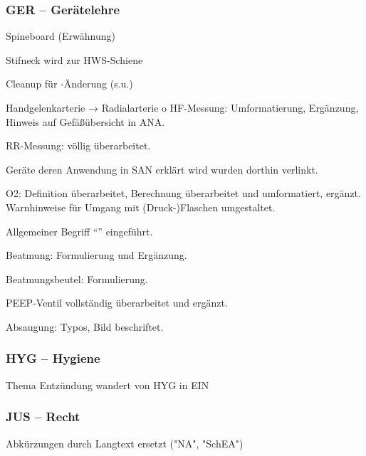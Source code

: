 \documentclass[ngerman,a4paper,fontsize=9pt,BCOR=0cm,DIV=11,headings=big,draft=no]{scrreprt}
\begin{document}
\subsubsection{GER -- Gerätelehre}

Spineboard (Erwähnung)

Stifneck wird zur HWS-Schiene


Cleanup für \gT-Änderung (s.u.)

Handgelenkarterie →
          Radialarterie o HF-Messung: Umformatierung, Ergänzung, Hinweis auf Gefäßübersicht in ANA.

RR-Messung: völlig
          überarbeitet. 
          
Geräte deren Anwendung in SAN erklärt wird wurden dorthin verlinkt.

O2: Definition überarbeitet,
Berechnung überarbeitet und umformatiert, ergänzt. Warnhinweise für Umgang mit (Druck-)Flaschen umgestaltet. 

Allgemeiner Begriff
"`"' eingeführt. 

Beatmung:
Formulierung und Ergänzung.

Beatmungsbeutel:
          Formulierung. 
          
PEEP-Ventil vollständig überarbeitet und ergänzt.

Absaugung: Typos, Bild beschriftet.


\subsubsection{HYG -- Hygiene}

Thema Entzündung wandert von HYG in
EIN




\subsubsection{JUS -- Recht}

Abkürzungen durch Langtext ersetzt ("NA", "SchEA")
\end{document}
